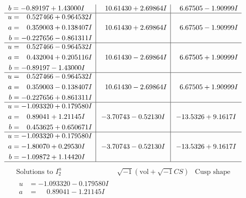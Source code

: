 \documentclass[1p]{elsarticle_modified}
\theoremstyle{definition}
\newcommand{\I}{\sqrt{-1}}
\begin{document}
$$\begin{array}{c|c|c}
\begin{aligned}
b &= -0.89197 + 1.43000 I\end{aligned}
 & \phantom{-}10.61430 + 2.69864 I & \phantom{-}6.67505 - 1.90999 I \\ \hline\begin{aligned}
u &= \phantom{-}0.527466 + 0.964532 I \\
a &= \phantom{-}0.359003 + 0.138407 I \\
b &= -0.227656 - 0.861311 I\end{aligned}
 & \phantom{-}10.61430 + 2.69864 I & \phantom{-}6.67505 - 1.90999 I \\ \hline\begin{aligned}
u &= \phantom{-}0.527466 - 0.964532 I \\
a &= \phantom{-}0.432004 + 0.205116 I \\
b &= -0.89197 - 1.43000 I\end{aligned}
 & \phantom{-}10.61430 - 2.69864 I & \phantom{-}6.67505 + 1.90999 I \\ \hline\begin{aligned}
u &= \phantom{-}0.527466 - 0.964532 I \\
a &= \phantom{-}0.359003 - 0.138407 I \\
b &= -0.227656 + 0.861311 I\end{aligned}
 & \phantom{-}10.61430 - 2.69864 I & \phantom{-}6.67505 + 1.90999 I \\ \hline\begin{aligned}
u &= -1.093320 + 0.179580 I \\
a &= \phantom{-}0.89041 + 1.21145 I \\
b &= \phantom{-}0.453625 + 0.650671 I\end{aligned}
 & -3.70743 - 0.52130 I & -13.5326 + 9.1617 I \\ \hline\begin{aligned}
u &= -1.093320 + 0.179580 I \\
a &= -1.80070 + 0.29530 I \\
b &= -1.09872 + 1.14420 I\end{aligned}
 & -3.70743 - 0.52130 I & -13.5326 + 9.1617 I\\
 \hline 
 \end{array}$$\newpage$$\begin{array}{c|c|c}  
\text{Solutions to }I^u_{2}& \I (\text{vol} + \sqrt{-1}CS) & \text{Cusp shape}\\
 \hline 
\begin{aligned}
u &= -1.093320 - 0.179580 I \\
a &= \phantom{-}0.89041 - 1.21145 I \\

\end{aligned}
\end{array}$$
\end{document}
